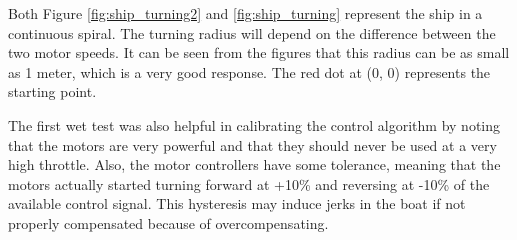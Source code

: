Both Figure \vref{fig:ship_turning2} and \vref{fig:ship_turning} represent the ship in a continuous spiral. The turning radius will depend on the difference between the two motor speeds. It can be seen from the figures that this radius can be as small as 1 meter, which is a very good response. The red dot at (0, 0) represents the starting point.

The first wet test was also helpful in calibrating the control algorithm by noting that the motors are very powerful and that they should never be used at a very high throttle. Also, the motor controllers have some tolerance, meaning that the motors actually started turning forward at +10\% and reversing at -10\% of the available control signal. This hysteresis may induce jerks in the boat if not properly compensated because of overcompensating.



